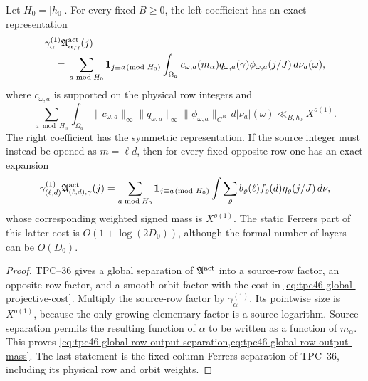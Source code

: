 \begin{proposition}
\label{prop:tpc46-row-output-projective}
Let \(H_0=|h_0|\).  For every fixed \(B\ge0\), the left coefficient has
an exact representation
\begin{align}
 &\gamma_\alpha^{(1)}
  \mathfrak A_{\alpha,\gamma}^{\rm act}(j)
 \notag\\
 &\quad={}
 \sum_{a\bmod H_0}\mathbf 1_{j\equiv a\!\!\pmod{H_0}}
 \int_{\Omega_a}
 c_{\omega,a}(m_\alpha)
 q_{\omega,a}(\gamma)
 \phi_{\omega,a}(j/J)\,d\nu_a(\omega),
 \label{eq:tpc46-global-row-output-separation}
\end{align}
where \(c_{\omega,a}\) is supported on the physical row integers and
\begin{equation}
 \sum_{a\bmod H_0}\int_{\Omega_a}
 \|c_{\omega,a}\|_\infty
 \|q_{\omega,a}\|_\infty
 \|\phi_{\omega,a}\|_{C^B}
 \,d|\nu_a|(\omega)
 \ll_{B,h_0}X^{o(1)}.
 \label{eq:tpc46-global-row-output-mass}
\end{equation}
The right coefficient has the symmetric representation.  If the source
integer must instead be opened as \(m=\ell d\), then for every fixed
opposite row one has an exact expansion
\begin{equation}
 \gamma_{(\ell,d)}^{(1)}
 \mathfrak A_{(\ell,d),\gamma}^{\rm act}(j)
 =\sum_{a\bmod H_0}\mathbf 1_{j\equiv a\!\!\pmod{H_0}}
  \int\sum_{\varrho}
  b_{\varrho}(\ell)f_{\varrho}(d)
  \eta_{\varrho}(j/J)\,d\nu,
 \label{eq:tpc46-fixed-column-separation}
\end{equation}
whose corresponding weighted signed mass is \(X^{o(1)}\).  The static
Ferrers part of this latter cost is \(O(1+\log(2D_0))\), although the
formal number of layers can be \(O(D_0)\).
\end{proposition}

\begin{proof}
TPC--36 gives a global separation of
\(\mathfrak A^{\rm act}\) into a source-row factor, an opposite-row
factor, and a smooth orbit factor with the cost in
\eqref{eq:tpc46-global-projective-cost}.  Multiply the source-row
factor by \(\gamma_\alpha^{(1)}\).  Its pointwise size is
\(X^{o(1)}\), because the only growing elementary factor is a source
logarithm.  Source separation permits the resulting function of
\(\alpha\) to be written as a function of \(m_\alpha\).  This proves
\cref{eq:tpc46-global-row-output-separation,eq:tpc46-global-row-output-mass}.
The last statement is the fixed-column Ferrers separation of TPC--36,
including its physical row and orbit weights.
\end{proof}

